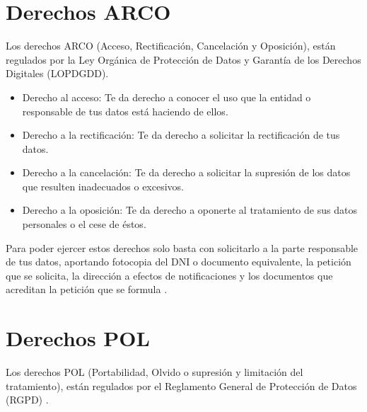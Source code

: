 \documentclass[
  spanish,
  a4paper,
  openany]{book}
\begin{document}
\hypertarget{derechos-arco}{%
\section{Derechos ARCO}\label{derechos-arco}}

Los derechos ARCO (Acceso, Rectificación, Cancelación y Oposición), están regulados por la Ley Orgánica de Protección de Datos y Garantía de los Derechos Digitales (LOPDGDD).

\begin{itemize}
\item
  Derecho al acceso: Te da derecho a conocer el uso que la entidad o responsable de tus datos está haciendo de ellos.
\item
  Derecho a la rectificación: Te da derecho a solicitar la rectificación de tus datos.
\item
  Derecho a la cancelación: Te da derecho a solicitar la supresión de los datos que resulten inadecuados o excesivos.
\item
  Derecho a la oposición: Te da derecho a oponerte al tratamiento de sus datos personales o el cese de éstos.
\end{itemize}

Para poder ejercer estos derechos solo basta con solicitarlo a la parte responsable de tus datos, aportando fotocopia del DNI o documento equivalente, la petición que se solicita, la dirección a efectos de notificaciones y los documentos que acreditan la petición que se formula \citep{arco}.

\hypertarget{derechos-pol}{%
\section{Derechos POL}\label{derechos-pol}}

Los derechos POL (Portabilidad, Olvido o supresión y limitación del tratamiento), están regulados por el Reglamento General de Protección de Datos (RGPD) \citep{pol}.
\end{document}
